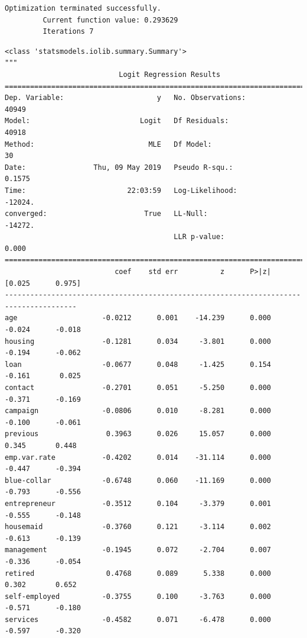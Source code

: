 \documentclass[8pt,onecolumn,aps,pra]{revtex4-1}
\begin{document}
    \begin{Verbatim}[commandchars=\\\{\}]
Optimization terminated successfully.
         Current function value: 0.293629
         Iterations 7

    \end{Verbatim}

    
    \begin{verbatim}
<class 'statsmodels.iolib.summary.Summary'>
"""
                           Logit Regression Results                           
==============================================================================
Dep. Variable:                      y   No. Observations:                40949
Model:                          Logit   Df Residuals:                    40918
Method:                           MLE   Df Model:                           30
Date:                Thu, 09 May 2019   Pseudo R-squ.:                  0.1575
Time:                        22:03:59   Log-Likelihood:                -12024.
converged:                       True   LL-Null:                       -14272.
                                        LLR p-value:                     0.000
=======================================================================================
                          coef    std err          z      P>|z|      [0.025      0.975]
---------------------------------------------------------------------------------------
age                    -0.0212      0.001    -14.239      0.000      -0.024      -0.018
housing                -0.1281      0.034     -3.801      0.000      -0.194      -0.062
loan                   -0.0677      0.048     -1.425      0.154      -0.161       0.025
contact                -0.2701      0.051     -5.250      0.000      -0.371      -0.169
campaign               -0.0806      0.010     -8.281      0.000      -0.100      -0.061
previous                0.3963      0.026     15.057      0.000       0.345       0.448
emp.var.rate           -0.4202      0.014    -31.114      0.000      -0.447      -0.394
blue-collar            -0.6748      0.060    -11.169      0.000      -0.793      -0.556
entrepreneur           -0.3512      0.104     -3.379      0.001      -0.555      -0.148
housemaid              -0.3760      0.121     -3.114      0.002      -0.613      -0.139
management             -0.1945      0.072     -2.704      0.007      -0.336      -0.054
retired                 0.4768      0.089      5.338      0.000       0.302       0.652
self-employed          -0.3755      0.100     -3.763      0.000      -0.571      -0.180
services               -0.4582      0.071     -6.478      0.000      -0.597      -0.320

\end{verbatim}
\end{document}
